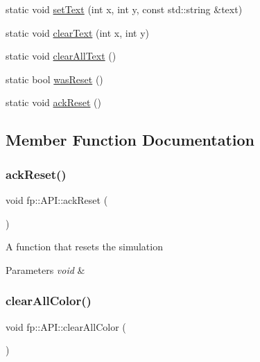 \begin{DoxyCompactItemize}
static void \hyperlink{classfp_1_1_a_p_i_a4635f5c0c48d2ab53f4436be402c5566}{set\+Text} (int x, int y, const std\+::string \&text)
\item 
static void \hyperlink{classfp_1_1_a_p_i_a0b23c3b22476d1826987b93b518010d1}{clear\+Text} (int x, int y)
\item 
static void \hyperlink{classfp_1_1_a_p_i_ae0b4d27428aad11e98647b88947f2c34}{clear\+All\+Text} ()
\item 
static bool \hyperlink{classfp_1_1_a_p_i_a390976eee05262068b7387f1421d906a}{was\+Reset} ()
\item 
static void \hyperlink{classfp_1_1_a_p_i_a0c30419c7237b12bc916ce17f93a5be4}{ack\+Reset} ()
\end{DoxyCompactItemize}


\subsection{Member Function Documentation}
\mbox{\label{classfp_1_1_a_p_i_a0c30419c7237b12bc916ce17f93a5be4}} 
\subsubsection{\texorpdfstring{ack\+Reset()}{ackReset()}}
{\footnotesize\ttfamily void fp\+::\+A\+P\+I\+::ack\+Reset (\begin{DoxyParamCaption}{ }\end{DoxyParamCaption})\hspace{0.3cm}{\ttfamily [static]}}

A function that resets the simulation 
\begin{DoxyParams}{Parameters}
{\em void} & \\
\hline
\end{DoxyParams}
\mbox{\label{classfp_1_1_a_p_i_a68f86debe50e6e2ae0c1fde795a1cfb6}} 
\subsubsection{\texorpdfstring{clear\+All\+Color()}{clearAllColor()}}
{\footnotesize\ttfamily void fp\+::\+A\+P\+I\+::clear\+All\+Color (\begin{DoxyParamCaption}{ }\end{DoxyParamCaption})\hspace{0.3cm}{\ttfamily [static]}}

